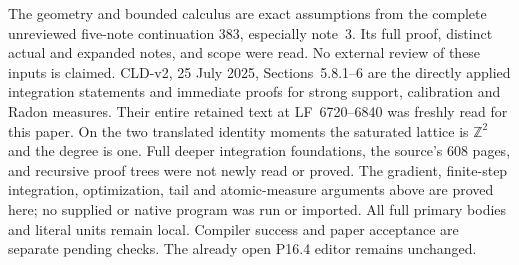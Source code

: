 \documentclass[11pt]{article}
\begin{document}
The geometry and bounded calculus are exact assumptions from the complete
unreviewed five-note continuation 383, especially note~3. Its full proof,
distinct actual and expanded notes, and scope were read. No external
review of these inputs is claimed. CLD-v2, 25 July 2025,
Sections~5.8.1--6 are the directly applied integration statements and
immediate proofs for strong support, calibration and Radon measures.
Their entire retained text at LF~6720--6840 was freshly read for this paper.
On the two translated identity moments the saturated lattice is
$\mathbb Z^2$ and the degree is one. Full deeper integration foundations,
the source's 608 pages, and recursive proof trees were not newly read or
proved. The gradient, finite-step integration, optimization, tail and
atomic-measure arguments above are proved here; no supplied or native
program was run or imported. All full primary bodies and literal units
remain local. Compiler success and paper acceptance are separate pending
checks. The already open P16.4 editor remains unchanged.
\end{document}
